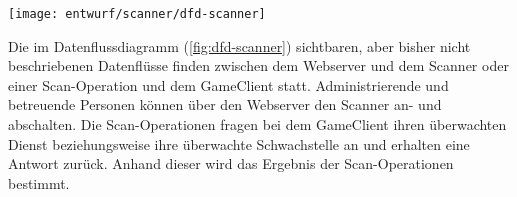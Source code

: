 \begin{center}
	\texttt{[image: entwurf/scanner/dfd-scanner]}
	\label{fig:dfd-scanner}
\end{center}

Die im Datenflussdiagramm (\autoref{fig:dfd-scanner}) sichtbaren, aber bisher nicht beschriebenen Datenflüsse finden zwischen dem Webserver und dem Scanner oder einer Scan-Operation und dem GameClient statt. Administrierende und betreuende Personen können über den Webserver den Scanner an- und abschalten. Die Scan-Operationen fragen bei dem GameClient ihren überwachten Dienst beziehungsweise ihre überwachte Schwachstelle an und erhalten eine Antwort zurück. Anhand dieser wird das Ergebnis der Scan-Operationen bestimmt.